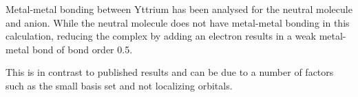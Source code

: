 \documentclass[11pt]{article}
\begin{document}
Metal-metal bonding between Yttrium has been analysed for the
neutral molecule and anion. While the neutral molecule does not
have metal-metal bonding in this calculation, reducing the complex
by adding an electron results in a weak metal-metal bond of bond order 0.5.

This is in contrast to published results and can be due to a number of
factors such as the small basis set and not localizing orbitals.

%

\printbibliography
\end{document}

